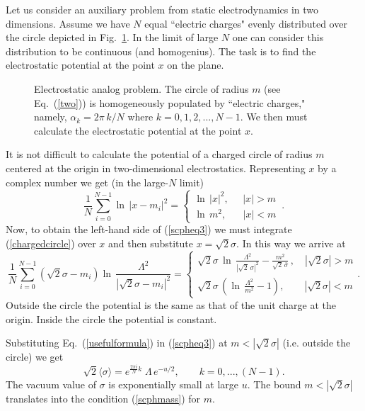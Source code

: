 \documentclass[epsfig,12pt]{article}
\def\beq{\begin{equation}}
\def\eeq{\end{equation}}
\def\beq{\begin{equation}}
\def\eeq{\end{equation}}
\begin{document}
{\vspace{2mm}

Let us consider an auxiliary problem from static electrodynamics in two dimensions.
Assume we have $N$ equal ``electric charges" evenly distributed over the circle
depicted in Fig.~\ref{circ}. In the limit of large $N$ one can consider this distribution to be continuous
(and homogenius). The task is to find the electrostatic potential at the point $x$ on the plane.

\begin{figure}
\epsfxsize=7cm
\centerline{}
\caption{\small Electrostatic analog problem. The circle of radius $m$ (see Eq.~(\ref{two}))
is homogeneously populated by ``electric charges," namely,
$\alpha_k = 2\pi \, k/N$ where $k= 0,1,2, ..., N-1$.
We then must calculate the electrostatic potential at the
point $x$.}
\label{circ}
\end{figure}
It is not difficult to calculate  the potential of a charged circle
of radius $m$  centered at the origin  in  two-dimensional electrostatics.
Representing $x$ by a complex  number we get (in the large-$N$ limit) 
\beq
\frac{1}{N}\sum_{i=0}^{N-1}\ln\, {|x-m_i|^2}
=\left\{
\begin{array}{cc}
\ln\,{|x|^2},\;\;\;\;\; |x|>m\\[2mm]
\ln\,{m^2},\;\;\;\;\;\; |x|<m
\end{array}\,.
\right.
\label{chargedcircle}
\eeq
Now, to obtain the left-hand side of (\ref{scpheq3}) we must integrate (\ref{chargedcircle})
over $x$ and then substitute $x=\sqrt{2}\sigma$. In this way we arrive at
\beq
 \frac{1}{N}\sum_{i=0}^{N-1}\left(\sqrt{2}\sigma-m_i\right)\ln\, {\frac{\Lambda^2}{|\sqrt{2}\sigma-m_i|^2}}
=\left\{
\begin{array}{cc}
\sqrt{2}\sigma\,\ln\, {\frac{\Lambda^2}{|\sqrt{2}\,\sigma|^2}}-\frac{m^2}{\sqrt{2}\,\bar\sigma}\,,\quad |\sqrt{2}\sigma|>m\\[3mm]
\sqrt{2}\sigma\,\left(\ln\, {\frac{\Lambda^2}{m^2}}-1\right),\qquad |\sqrt{2}\sigma|<m
\end{array}
\right. .
\label{usefulformula}
\eeq
Outside the circle the potential is the same as that of the unit charge at the origin.
Inside the circle the potential is constant.


Substituting Eq.~(\ref{usefulformula}) in (\ref{scpheq3}) at  $m<|\sqrt{2}\sigma|$ 
(i.e. outside the circle) we get
\beq
\sqrt{2}\langle \sigma\rangle=e^{\frac{2\pi i}{N}k}\;\Lambda\,e^{-u/2},\qquad k=0,...,(N-1).
\label{scphsigma}
\eeq
The vacuum value of $\sigma$ is exponentially small at large $u$. The bound $m<|\sqrt{2}\sigma|$
translates into the condition (\ref{scphmass}) for  $m$. 

}
\end{document}
